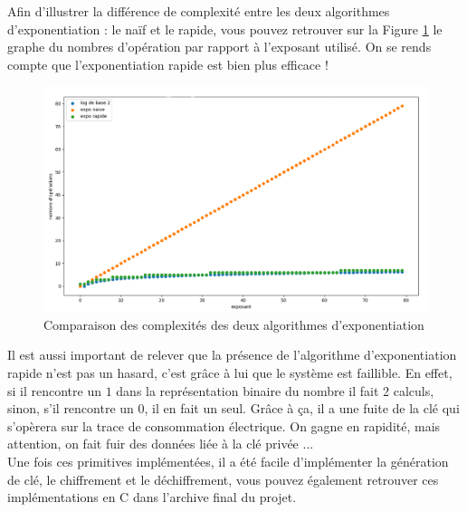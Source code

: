 Afin d'illustrer la différence de complexité entre les deux algorithmes d'exponentiation : le naïf et le rapide, vous pouvez retrouver sur la Figure \ref{fig:diff_complexite} le graphe du nombres d'opération par rapport à l'exposant utilisé. On se rends compte que l'exponentiation rapide est bien plus efficace !
\begin{figure}[H]
    \centering
    \includegraphics[width=\textwidth]{fig/diff_complexite.png}
    \caption{Comparaison des complexités des deux algorithmes d'exponentiation}
    \label{fig:diff_complexite}
\end{figure}
Il est aussi important de relever que la présence de l'algorithme d’exponentiation rapide n'est pas un hasard, c'est grâce à lui que le système est faillible. En effet, si il rencontre un $1$ dans la représentation binaire du nombre il fait 2 calculs, sinon, s'il rencontre un $0$, il en fait un seul. Grâce à ça, il a une fuite de la clé qui s’opèrera sur la trace de consommation électrique. On gagne en rapidité, mais attention, on fait fuir des données liée à la clé privée ...\\

Une fois ces primitives implémentées, il a été facile d'implémenter la génération de clé, le chiffrement et le déchiffrement, vous pouvez également retrouver ces implémentations en C dans l'archive final du projet.

